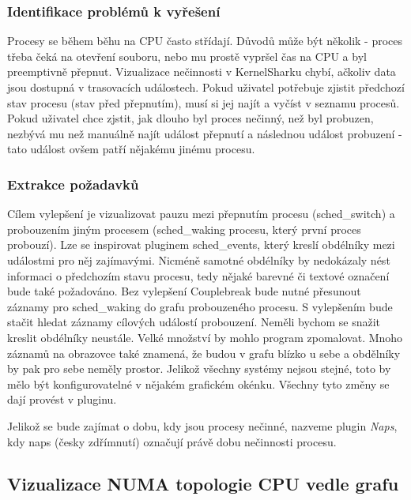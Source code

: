 \subsubsection*{Identifikace problémů k vyřešení}
Procesy se během běhu na CPU často střídají. Důvodů může být několik - proces třeba čeká na otevření souboru, nebo mu prostě vypršel čas na CPU a byl preemptivně přepnut. Vizualizace nečinnosti v KernelSharku chybí, ačkoliv data jsou dostupná v trasovacích událostech. Pokud uživatel potřebuje zjistit předchozí stav procesu (stav před přepnutím), musí si jej najít a vyčíst v seznamu procesů. Pokud uživatel chce zjstit, jak dlouho byl proces nečinný, než byl probuzen, nezbývá mu než manuálně najít událost přepnutí a následnou událost probuzení - tato událost ovšem patří nějakému jinému procesu.

\subsubsection*{Extrakce požadavků}
Cílem vylepšení je vizualizovat pauzu mezi přepnutím procesu (sched\_switch) a probouzením jiným procesem (sched\_waking procesu, který první proces probouzí). Lze se inspirovat pluginem sched\_events, který kreslí obdélníky mezi událostmi pro něj zajímavými. Nicméně samotné obdélníky by nedokázaly nést informaci o předchozím stavu procesu, tedy nějaké barevné či textové označení bude také požadováno. Bez vylepšení Couplebreak bude nutné přesunout záznamy pro sched\_waking do grafu probouzeného procesu. S vylepšením bude stačit hledat záznamy cílových událostí probouzení. Neměli bychom se snažit kreslit obdélníky neustále. Velké množství by mohlo program zpomalovat. Mnoho záznamů na obrazovce také znamená, že budou v grafu blízko u sebe a obdělníky by pak pro sebe neměly prostor. Jelikož všechny systémy nejsou stejné, toto by mělo být konfigurovatelné v nějakém grafickém okénku. Všechny tyto změny se dají provést v pluginu.

Jelikož se bude zajímat o dobu, kdy jsou procesy nečinné, nazveme plugin \emph{Naps}, kdy naps (česky zdřímnutí) označují právě dobu nečinnosti procesu.

\subsection{Vizualizace NUMA topologie CPU vedle grafu}

